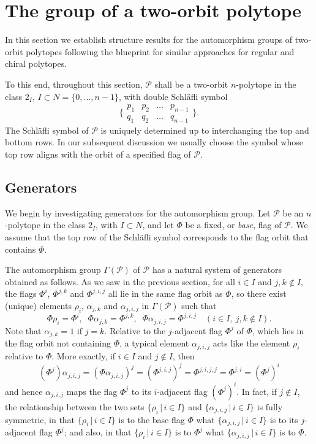 \documentclass[12pt]{article}
\renewcommand{\>}{\rangle}
\theoremstyle{definition}\newtheorem{definition}{Definition}[section]
\begin{document}
\section{The group of a two-orbit polytope}
\label{grour}

In this section we establish structure results for the automorphism groups of two-orbit polytopes following the blueprint for similar approaches for regular and chiral polytopes.

To this end, throughout this section, $\mathcal{P}$ shall be a two-orbit $n$-polytope in the class $2_I$, $I\subset N=\{0,\ldots,n-1\}$, with double Schl\"afli symbol 
$$\Big\{ 
\begin{matrix} 
p_1 &\! p_2 &\! \dots &\! p_{n-1} \\
q_1 &\! q_2 &\! \dots &\! q_{n-1}
\end{matrix} \Big\}.$$
The Schl\"afli symbol of $\mathcal{P}$ is uniquely determined up to interchanging the top and bottom rows. In our subsequent discussion we usually choose the symbol whose top row aligns with the orbit of a specified flag of $\mathcal{P}$. 

\subsection{Generators}
\label{gensection}

We begin by investigating generators for the automorphism group. Let $\mathcal{P}$ be an $n$-polytope in the class $2_I$, with $I\subset N$, and let $\Phi$ be a fixed, or {\em base\/}, flag of $\mathcal{P}$. We assume that the top row of the Schl\"afli symbol corresponds to the flag orbit that contains $\Phi$.

The automorphism group $\Gamma(\mathcal{P})$ of $\mathcal{P}$ has a natural system of generators obtained as follows. As we saw in the previous section, for all $i \in I$ and $j,k \notin I$, the flags $\Phi^i$, $\Phi^{j,k}$ and $\Phi^{j,i,j}$ all lie in the same flag orbit as $\Phi$, so there exist (unique) elements $\rho_i$, $\alpha_{j,k}$ and $\alpha_{j,i,j}$ in $\Gamma(\mathcal{P})$ 
such that
\begin{equation}
\label{phiaction}
\Phi\rho_{i}=\Phi^{i},\;\; \Phi\alpha_{j,k}=\Phi^{j,k},\;\; \Phi\alpha_{j,i,j}=\Phi^{j,i,j} \quad (i\in I,\ \! j,k\notin I).
\end{equation}
Note that $\alpha_{j,k}=1$ if $j=k$. Relative to the $j$-adjacent flag $\Phi^j$ of $\Phi$, which lies in the flag orbit not containing $\Phi$, a typical element $\alpha_{j,i,j}$ acts like the element $\rho_i$ relative to $\Phi$. More exactly, if $i\in I$ and $j\notin I$, then 
\[ (\Phi^{j})\alpha_{j,i,j} = (\Phi\alpha_{j,i,j})^{j} = (\Phi^{j,i,j})^{j}
= \Phi^{j,i,j,j} = \Phi^{j,i} = (\Phi^{j})^{i}\]
and hence $\alpha_{j,i,j}$ maps the flag $\Phi^{j}$ to its $i$-adjacent flag $(\Phi^{j})^{i}$. In fact, if $j\notin I$, the relationship between the two sets $\{\rho_i\,|\,i\in I\}$ and $\{\alpha_{j,i,j}\,|\,i\in I\}$ is fully symmetric, in that $\{\rho_i\,|\, i\in I\}$ is to the base flag $\Phi$ what $\{\alpha_{j,i,j}\,|\, i\in I\}$ is to its $j$-adjacent flag $\Phi^j$; and also, in that $\{\rho_i\,|\, i\in I\}$ is to $\Phi^j$ what $\{\alpha_{j,i,j}\,|\, i\in I\}$ is to $\Phi$. 
\end{document}
